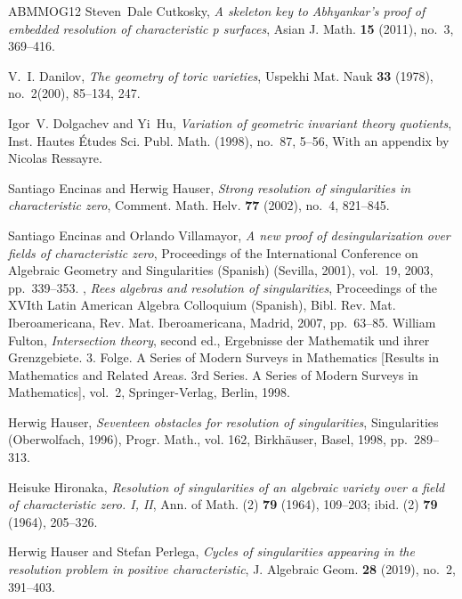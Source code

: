 \documentclass{amsart}
\begin{document}
\begin{thebibliography}{ABMMOG12}
Steven~Dale Cutkosky, \emph{A skeleton key to {A}bhyankar's proof of embedded
  resolution of characteristic p surfaces}, Asian J. Math. \textbf{15} (2011),
  no.~3, 369--416. 

V.~I. Danilov, \emph{The geometry of toric varieties}, Uspekhi Mat. Nauk
  \textbf{33} (1978), no.~2(200), 85--134, 247. 

Igor~V. Dolgachev and Yi~Hu, \emph{Variation of geometric invariant theory
  quotients}, Inst. Hautes \'Etudes Sci. Publ. Math. (1998), no.~87, 5--56,
  With an appendix by Nicolas Ressayre. 

Santiago Encinas and Herwig Hauser, \emph{Strong resolution of singularities in
  characteristic zero}, Comment. Math. Helv. \textbf{77} (2002), no.~4,
  821--845. 

Santiago Encinas and Orlando Villamayor, \emph{A new proof of desingularization
  over fields of characteristic zero}, Proceedings of the {I}nternational
  {C}onference on {A}lgebraic {G}eometry and {S}ingularities ({S}panish)
  ({S}evilla, 2001), vol.~19, 2003, pp.~339--353. 
\bysame, \emph{Rees algebras and resolution of singularities}, Proceedings of
  the {XVI}th {L}atin {A}merican {A}lgebra {C}olloquium ({S}panish), Bibl. Rev.
  Mat. Iberoamericana, Rev. Mat. Iberoamericana, Madrid, 2007, pp.~63--85.
William Fulton, \emph{Intersection theory}, second ed., Ergebnisse der
  Mathematik und ihrer Grenzgebiete. 3. Folge. A Series of Modern Surveys in
  Mathematics [Results in Mathematics and Related Areas. 3rd Series. A Series
  of Modern Surveys in Mathematics], vol.~2, Springer-Verlag, Berlin, 1998.

Herwig Hauser, \emph{Seventeen obstacles for resolution of singularities},
  Singularities ({O}berwolfach, 1996), Progr. Math., vol. 162, Birkh\"{a}user,
  Basel, 1998, pp.~289--313. 

Heisuke Hironaka, \emph{Resolution of singularities of an algebraic variety
  over a field of characteristic zero. {I}, {II}}, Ann. of Math. (2) {\bf 79}
  (1964), 109--203; ibid. (2) \textbf{79} (1964), 205--326. 

Herwig Hauser and Stefan Perlega, \emph{Cycles of singularities appearing in
  the resolution problem in positive characteristic}, J. Algebraic Geom.
  \textbf{28} (2019), no.~2, 391--403. 


\end{thebibliography}
\end{document}
